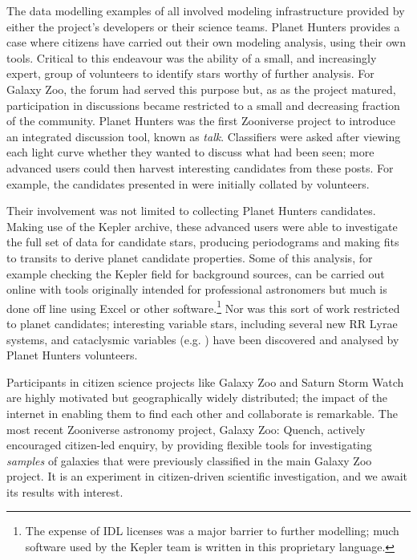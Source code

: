 \documentclass{ar2e}
\begin{document}
The data modelling examples of  all involved modeling
infrastructure provided by either the project's developers or their science
teams. Planet Hunters provides a case where citizens have carried out their own
modeling analysis, using their own tools. Critical to this endeavour was the ability of a small, 
and increasingly expert, group of volunteers to identify stars worthy of further analysis. For
Galaxy Zoo, the forum had served this purpose but, as as the project matured, participation in discussions
became restricted to a small and decreasing fraction of the community. Planet Hunters was the first
Zooniverse project to introduce an integrated discussion tool, known as \emph{talk}. Classifiers were asked
after viewing each light curve whether they wanted to discuss what had been seen; more advanced users
could then harvest interesting candidates from these posts. For example, the candidates presented in \citet{LintottPH} were initially
collated by volunteers.

Their involvement was not limited to collecting Planet Hunters candidates. Making use of the Kepler archive, these
advanced users were able to investigate the full set of data for candidate stars, producing periodograms and making fits 
to transits to derive planet candidate properties. Some of this analysis, for example checking the Kepler field for 
background sources, can be carried out online with tools originally intended for professional astronomers but much
is done off line using Excel or other software.\footnote{The expense of IDL licenses was a major barrier to further modelling; much 
software used by the Kepler team is written in this proprietary language.} Nor was this sort of work restricted to planet candidates; interesting
variable stars, including several new RR Lyrae systems, and cataclysmic variables (e.g. \citet{KatoOsaki}) have been discovered and analysed by
Planet Hunters volunteers. 





Participants in citizen science projects like Galaxy Zoo and Saturn Storm Watch 
are highly motivated but geographically widely distributed; the impact of the
internet in enabling them to find each other and collaborate is remarkable. The
most recent Zooniverse astronomy project, Galaxy Zoo: Quench, actively
encouraged citizen-led enquiry, by providing flexible tools for investigating
{\it samples} of galaxies that were previously classified in the  main Galaxy
Zoo project. It is an experiment in citizen-driven scientific investigation, and
we await its results with interest.
\end{document}
